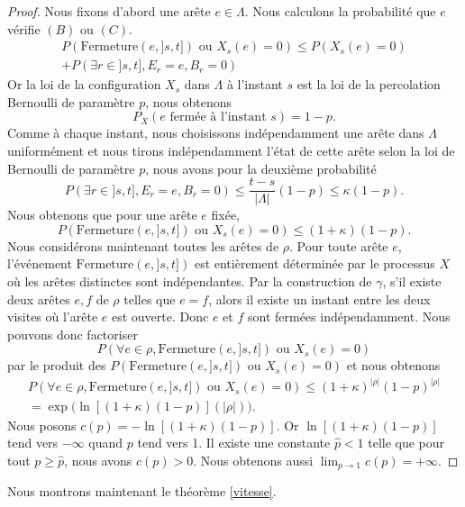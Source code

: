 \documentclass[titlepage,a4paper,12pt]{article}
\newcounter{th}
\begin{document}
\begin{proof}
Nous fixons d'abord une arête $e\in \Lambda$. Nous calculons la probabilité que $e$ vérifie $(B)$ ou $(C)$.
\begin{multline*}P\left( \mathrm{Fermeture}(e,]s,t])\text{ ou }X_s(e) = 0 \right)\leqslant P(X_s(e) = 0)\\+P(\exists r \in ]s,t], E_r = e, B_r = 0)
\end{multline*}
Or la loi de la configuration $X_s$ dans $\Lambda$ à l'instant $s$ est la loi de la percolation Bernoulli de paramètre $p$, nous obtenons $$P_X(e \text{ fermée à l'instant } s) = 1-p.$$
Comme à chaque instant, nous choisissons indépendamment une arête dans $\Lambda$ uniformément et nous tirons indépendamment l'état de cette arête selon la loi de Bernoulli de paramètre $p$, nous avons pour la deuxième probabilité
$$ P(\exists r \in ]s,t], E_r = e, B_r = 0) \leqslant \frac{t-s}{|\Lambda|}(1-p)\leqslant \kappa(1-p).
$$
Nous obtenons que pour une arête $e$ fixée, $$P\left( \mathrm{Fermeture}(e,]s,t])\text{ ou }X_s(e) = 0 \right)\leqslant (1+\kappa)(1-p).$$
Nous considérons maintenant toutes les arêtes de $\rho$. Pour toute arête $e$, l'événement $\mathrm{Fermeture}(e,]s,t])$ est entièrement déterminée par le processus $X$ où les arêtes distinctes sont indépendantes. Par la construction de $\gamma$, s'il existe deux arêtes $e,f$ de $\rho$ telles que $e = f$, alors il existe un instant entre les deux visites où l'arête $e$ est ouverte. Donc $e$ et $f$ sont fermées indépendamment. Nous pouvons donc factoriser $$P(\forall e\in \rho, \mathrm{Fermeture}(e,]s,t])\text{ ou } X_s(e) =0)$$ par le produit des $P(\mathrm{Fermeture}(e,]s,t])\text{ ou } X_s(e) =0)$ et nous obtenons 
\begin{multline*}P\left(\forall e\in \rho, \mathrm{Fermeture}(e,]s,t])\text{ ou }X_s(e) = 0\right)\leqslant (1+\kappa)^{|\rho|}(1-p)^{|\rho|}\\ = \exp\big(\ln[(1+\kappa)(1-p)](|\rho|)\big).
\end{multline*}
Nous posons $c(p) = -\ln[(1+\kappa)(1-p)]$. Or $\ln[(1+\kappa)(1-p)]$ tend vers $-\infty$ quand $p$ tend vers 1. Il existe une constante $\hat{p}<1$ telle que pour tout $p\geqslant \hat{p}$, nous avons $c(p)>0$. Nous obtenons aussi 
$ \lim_{p\rightarrow 1}c(p) = +\infty
$.
\end{proof}
Nous montrons maintenant le théorème \ref{vitesse}. 
\end{document}
